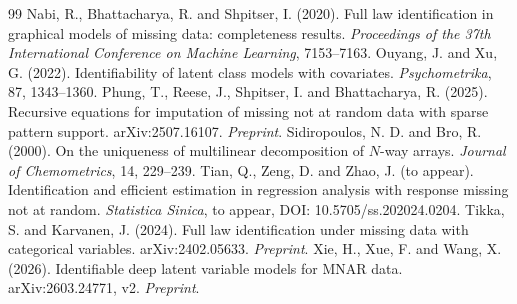 \documentclass[11pt,a4paper]{ltjsarticle}
\theoremstyle{remark}\newtheorem{remark}{注意}[section]
\begin{document}
\begin{thebibliography}{99}
 Nabi, R., Bhattacharya, R. and Shpitser, I. (2020). Full law identification in graphical models of missing data: completeness results. \emph{Proceedings of the 37th International Conference on Machine Learning}, 7153--7163.
 Ouyang, J. and Xu, G. (2022). Identifiability of latent class models with covariates. \emph{Psychometrika}, 87, 1343--1360.
 Phung, T., Reese, J., Shpitser, I. and Bhattacharya, R. (2025). Recursive equations for imputation of missing not at random data with sparse pattern support. arXiv:2507.16107. \emph{Preprint}.
 Sidiropoulos, N. D. and Bro, R. (2000). On the uniqueness of multilinear decomposition of $N$-way arrays. \emph{Journal of Chemometrics}, 14, 229--239.
 Tian, Q., Zeng, D. and Zhao, J. (to appear). Identification and efficient estimation in regression analysis with response missing not at random. \emph{Statistica Sinica}, to appear, DOI: 10.5705/ss.202024.0204.
 Tikka, S. and Karvanen, J. (2024). Full law identification under missing data with categorical variables. arXiv:2402.05633. \emph{Preprint}.
 Xie, H., Xue, F. and Wang, X. (2026). Identifiable deep latent variable models for MNAR data. arXiv:2603.24771, v2. \emph{Preprint}.
\end{thebibliography}
\end{document}
